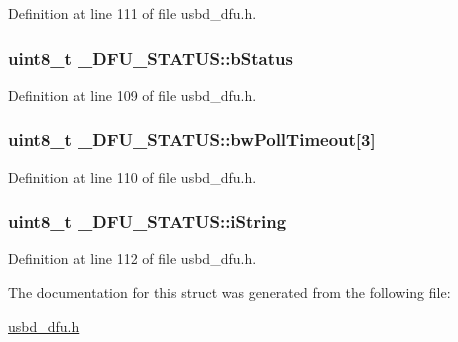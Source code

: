 Definition at line 111 of file usbd\+\_\+dfu.\+h.

\subsubsection[{\texorpdfstring{b\+Status}{bStatus}}]{\setlength{\rightskip}{0pt plus 5cm}uint8\+\_\+t \+\_\+\+D\+F\+U\+\_\+\+S\+T\+A\+T\+U\+S\+::b\+Status}\hypertarget{struct__DFU__STATUS_a119f8cd204d5cac52dc10c5a05847c11}{}\label{struct__DFU__STATUS_a119f8cd204d5cac52dc10c5a05847c11}


Definition at line 109 of file usbd\+\_\+dfu.\+h.

\subsubsection[{\texorpdfstring{bw\+Poll\+Timeout}{bwPollTimeout}}]{\setlength{\rightskip}{0pt plus 5cm}uint8\+\_\+t \+\_\+\+D\+F\+U\+\_\+\+S\+T\+A\+T\+U\+S\+::bw\+Poll\+Timeout\mbox{[}3\mbox{]}}\hypertarget{struct__DFU__STATUS_acb250abf9daba1a07c7ec98cb0e89bfe}{}\label{struct__DFU__STATUS_acb250abf9daba1a07c7ec98cb0e89bfe}


Definition at line 110 of file usbd\+\_\+dfu.\+h.

\subsubsection[{\texorpdfstring{i\+String}{iString}}]{\setlength{\rightskip}{0pt plus 5cm}uint8\+\_\+t \+\_\+\+D\+F\+U\+\_\+\+S\+T\+A\+T\+U\+S\+::i\+String}\hypertarget{struct__DFU__STATUS_ab486ff4ce617b2808ec80d0188403aab}{}\label{struct__DFU__STATUS_ab486ff4ce617b2808ec80d0188403aab}


Definition at line 112 of file usbd\+\_\+dfu.\+h.



The documentation for this struct was generated from the following file\+:\begin{DoxyCompactItemize}
\item 
\hyperlink{usbd__dfu_8h}{usbd\+\_\+dfu.\+h}\end{DoxyCompactItemize}
